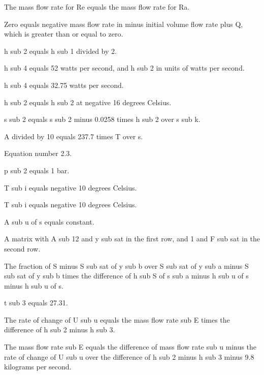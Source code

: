 The mass flow rate for Re equals the mass flow rate for Ra.

Zero equals negative mass flow rate in minus initial volume flow rate plus Q, which is greater than or equal to zero.

h sub 2 equals h sub 1 divided by 2.

h sub 4 equals 52 watts per second, and h sub 2 in units of watts per second.

h sub 4 equals 32.75 watts per second.

h sub 2 equals h sub 2 at negative 16 degrees Celsius.

s sub 2 equals s sub 2 minus 0.0258 times h sub 2 over s sub k.

A divided by 10 equals 237.7 times T over s.

Equation number 2.3.

p sub 2 equals 1 bar.

T sub i equals negative 10 degrees Celsius.

T sub i equals negative 10 degrees Celsius.

A sub u of s equals constant.

A matrix with A sub 12 and y sub sat in the first row, and 1 and F sub sat in the second row.

The fraction of S minus S sub sat of y sub b over S sub sat of y sub a minus S sub sat of y sub b times the difference of h sub S of s sub a minus h sub u of s minus h sub u of s.

t sub 3 equals 27.31.

The rate of change of U sub u equals the mass flow rate sub E times the difference of h sub 2 minus h sub 3.

The mass flow rate sub E equals the difference of mass flow rate sub u minus the rate of change of U sub u over the difference of h sub 2 minus h sub 3 minus 9.8 kilograms per second.